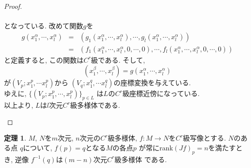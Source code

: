 \documentclass[a4j,12pt]{jarticle}
\theoremstyle{definition}
\newtheorem{theorem}{定理}[section]
\begin{document}
\begin{proof}
\begin{itemize}
\begin{eqnarray*}
        \end{eqnarray*}
        となっている. 改めて関数$g$を
        \begin{eqnarray*}
            g(x^\alpha_1, \cdots ,x^\alpha_l)&=&
            (g_1(x^\alpha_1, \cdots ,x^\alpha_l), \cdots 
            , g_l(x^\alpha_1, \cdots ,x^\alpha_l))\\
            &=&(f_1(x^\alpha_1, \cdots ,x^\alpha_l,0,\cdots ,0), \cdots 
            , f_l(x^\alpha_1, \cdots ,x^\alpha_l,0,\cdots ,0))
        \end{eqnarray*}
        と定義すると, この関数は$C^r$級である. 
        そして, 
        $$(x^\beta_1, \cdots ,x^\beta_l)
        =g(x^\alpha_1, \cdots ,x^\alpha_l)$$
        が$(V_p;x^p_1,\cdots x^p_l)$から
        $(V_q;x^q_1,\cdots x^q_l)$の座標変換を与えている. \\
        ゆえに, $\{(V_p;x^p_1,\cdots ,x^p_l)\}_{p\in L}$
        は$L$の$C^r$級座標近傍になっている. \\
        以上より, $L$は$l$次元$C^r$級多様体である. 
    \end{itemize}
\end{proof}
\begin{theorem}\label{theo:f^{-1}(q) C^r manifold}
    $M$, $N$を$m$次元, $n$次元の$C^r$級多様体, 
    $f:M\to N$を$C^r$級写像とする. $N$のある点
    $q$について, $f(p)=q$となる$M$の各点$p$
    が常にrank$(Jf)_p=n$を満たすとき, 逆像
    $f^{-1}(q)$は$(m-n)$次元$C^r$級多様体
    である. 
\end{theorem}
\end{document}

